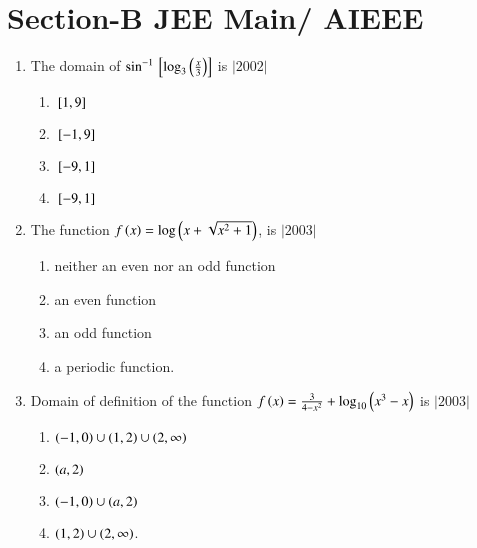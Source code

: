 \documentclass[journal,12pt,onecolumn,article]{IEEEtran}
\theoremstyle{remark}
\begin{document}
   \section*{Section-B JEE Main/ AIEEE}
	  \begin{enumerate}
		  \item The domain of $\sin^{-1}{}\left[\log_3\left(\frac{x}{3}\right)\right]$ is 
			  \hfill$|2002|$
			  \begin{enumerate}
				  \item ${}\left[1,9\right]$    
				  \item ${}\left[-1,9\right]$    
				  \item ${}\left[-9,1\right]$     
				  \item ${}\left[-9,1\right]$
			  \end{enumerate}
		  \item The function $f\left(x\right)=\log\left(x+\sqrt{x^2+1}\right)$, is 
			  \hfill$|2003|$
			  \begin{enumerate}
		  \item neither an even nor an odd function
		  \item an even function
		  \item an odd function
		  \item a periodic function.
			  \end{enumerate}
		  \item Domain of definition of the function ${f\left(x\right)=\frac{3}{4-x^2}+\log_{10}\left(x^3-x\right)}$ is 
			  \hfill$|2003|$
			  \begin{enumerate}
				  \item $\left(-1,0\right)\cup\left(1,2\right)\cup\left(2,\infty\right)$     
				  \item $\left(a,2\right)$
				  \item $\left(-1,0\right)\cup\left(a,2\right)$                   
				  \item $\left(1,2\right)\cup\left(2,\infty\right)$.
			  \end{enumerate}
	  \end{enumerate}
\end{document}
